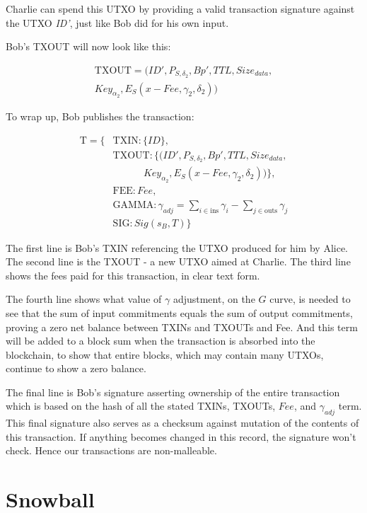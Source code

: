 \documentclass[8pt,fleqn,openany]{book}
\begin{document}
Charlie can spend this UTXO by providing a valid transaction signature against the UTXO \textit{ID'}, just like Bob did for his own input. 

Bob's TXOUT will now look like this:

\begin{multline*}
\text{TXOUT} = (ID', P_{S, \delta_2}, Bp', TTL, Size_{data},\\ 
                Key_{\alpha_2}, E_S(x - Fee, \gamma_2, \delta_2))
\end{multline*}

To wrap up, Bob publishes the transaction:

\begin{align*}
\text{T} = \{&\text{TXIN} : \{\mathit{ID}\}, \\
 &\text{TXOUT} : \{(ID', P_{S, \delta_2}, Bp', TTL, Size_{data}, \\
 & \ \ \ \ \ \ \ \ \ \ \ \ \ \ Key_{\alpha_2}, E_S(x - Fee, \gamma_2, \delta_2))\}, \\
 &\text{FEE} : \mathit{Fee}, \\
 &\text{GAMMA} : \gamma_{\mathit{adj}} = \sum_{i \in \text{ins}}{\gamma_i} - \sum_{j \in \text{outs}}{\gamma_j}\\
 &\text{SIG} : \mathit{Sig}(s_B, T)\}
\end{align*}

The first line is Bob's TXIN referencing the UTXO produced for him by Alice. The second line is the TXOUT - a new UTXO aimed at Charlie. The third line shows the fees paid for this transaction, in clear text form. 

The fourth line shows what value of $\gamma$ adjustment, on the $G$ curve, is needed to see that the sum of input commitments equals the sum of output commitments, proving a zero net balance between TXINs and TXOUTs and Fee. And this term will be added to a block sum when the transaction is absorbed into the blockchain, to show that entire blocks, which may contain many UTXOs, continue to show a zero balance.

The final line is Bob's signature asserting ownership of the entire transaction which is based on the hash of all the stated TXINs, TXOUTs, $Fee$, and $\gamma_{adj}$ term. This final signature also serves as a checksum against mutation of the contents of this transaction. If anything becomes changed in this record, the signature won't check. Hence our transactions are non-malleable.

\chapter{Snowball}\label{app:snowball}
\end{document}
